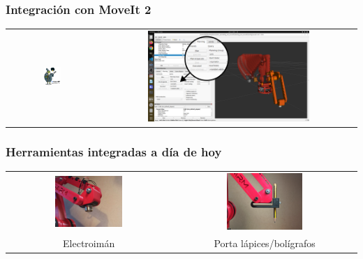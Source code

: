 \documentclass{beamer}
\begin{document}
\begin{frame}
\frametitle{Integración con MoveIt 2}
\begin{table}[htbp]
  \centering
  \begin{tabular}{cc}
      \includegraphics[width=0.2\textwidth, valign=m]{figs/setup_assistant.jpg} & \includegraphics[width=0.65\textwidth, valign=m]{figs/moveit_demo_trajectory.png} 
  \end{tabular}
\end{table}  
\end{frame}

\begin{frame}
\frametitle{Herramientas integradas a día de hoy}
\begin{table}[htbp]
  \centering
  \begin{tabular}{cc}
      \includegraphics[width=0.43\textwidth, valign=m]{figs/electromagnet_tool.jpeg} & \includegraphics[width=0.43\textwidth, valign=m]{figs/pen_tool.jpg}  \\
      Electroimán & Porta lápices/bolígrafos
  \end{tabular}
\end{table}  
\end{frame}
\end{document}
